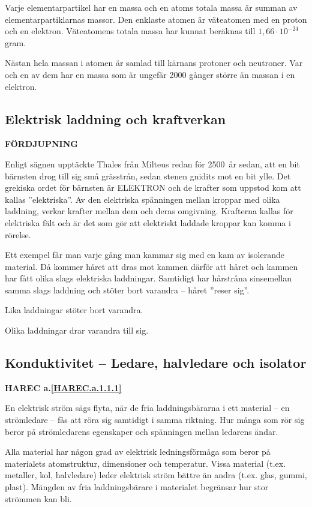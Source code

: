 Varje elementarpartikel har en massa och en atoms totala massa är summan av
elementarpartiklarnas massor.
Den enklaste atomen är väteatomen med en proton och en elektron.
Väteatomens totala massa har kunnat beräknas till \(1,66 \cdot 10^{-24}\) gram.

Nästan hela massan i atomen är samlad till kärnans protoner och neutroner.
Var och en av dem har en massa som är ungefär 2000 gånger större än massan i en
elektron.

\subsection{Elektrisk laddning och kraftverkan}
\textbf{FÖRDJUPNING}

Enligt sägnen upptäckte Thales från Milteus redan för 2500~år sedan, att en bit
bärnsten drog till sig små grässtrån, sedan stenen gnidits mot en bit ylle.
Det grekiska ordet för bärnsten är ELEKTRON och de krafter som uppstod kom att
kallas ''elektriska''.
Av den elektriska spänningen mellan kroppar med olika laddning, verkar krafter
mellan dem och deras omgivning.
Krafterna kallas för elektriska fält och är det som gör att elektriskt laddade
kroppar kan komma i rörelse.

Ett exempel får man varje gång man kammar sig med en kam av isolerande material.
Då kommer håret att dras mot kammen därför att håret och kammen har
fått olika slags elektriska laddningar.
Samtidigt har hårstråna sinsemellan samma slags laddning och stöter bort
varandra -- håret ''reser sig''.

Lika laddningar stöter bort varandra.

Olika laddningar drar varandra till sig.

\subsection{Konduktivitet -- Ledare, halvledare och isolator}
\textbf{HAREC a.\ref{HAREC.a.1.1.1}\label{myHAREC.a.1.1.1}}

En elektrisk ström sägs flyta, när de fria laddningsbärarna i ett material -- en
strömledare -- fås att röra sig samtidigt i samma riktning.
Hur många som rör sig beror på strömledarens egenskaper och spänningen mellan
ledarens ändar.

Alla material har någon grad av elektrisk ledningsförmåga som beror på
materialets atomstruktur, dimensioner och temperatur.
Vissa material (t.ex. metaller, kol, halvledare) leder elektrisk ström bättre
än andra (t.ex. glas, gummi, plast).
Mängden av fria laddningsbärare i materialet begränsar hur stor strömmen kan
bli.


